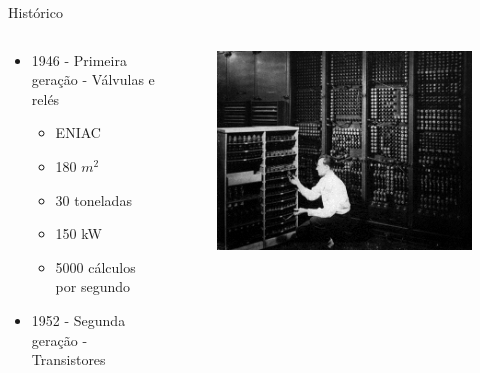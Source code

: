 \documentclass[aspectratio=169,
				xcolor=table]{beamer}
\begin{document}
	\begin{frame}{Histórico}
	
		\begin{columns}
			\begin{column}{0.6\textwidth}
				\begin{itemize}
					\item 1946 - Primeira geração - Válvulas e relés
						\begin{itemize}
							\item ENIAC
							\item 180 $m^2$
							\item 30 toneladas
							\item 150 kW
							\item 5000 cálculos por segundo
						\end{itemize}			
					\vspace{1em}
					\item 1952 - Segunda geração - Transistores
				\end{itemize}
			\end{column}
			\begin{column}{0.4\textwidth}
				\begin{figure}[hbtp]
				\centering
				\includegraphics[width=.95\textwidth, keepaspectratio]{../figs/cap04/eniac.png}
				\end{figure}			

			\end{column}
		\end{columns}
	\end{frame}
	
\end{document}
